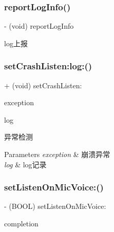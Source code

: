 \subsubsection{\texorpdfstring{report\+Log\+Info()}{reportLogInfo()}}
{\footnotesize\ttfamily -\/ (void) report\+Log\+Info \begin{DoxyParamCaption}{ }\end{DoxyParamCaption}}

log上报 \mbox{\label{interface_c_c_streamer_basic_ac720b0a4b258eebdc14ab97bac4dc42d}} 
\subsubsection{\texorpdfstring{set\+Crash\+Listen\+:log\+:()}{setCrashListen:log:()}}
{\footnotesize\ttfamily + (void) set\+Crash\+Listen\+: \begin{DoxyParamCaption}\item[{(B\+O\+OL)}]{exception }\item[{log:(B\+O\+OL)}]{log }\end{DoxyParamCaption}}

异常检测 
\begin{DoxyParams}{Parameters}
{\em exception} & 崩溃异常 \\
\hline
{\em log} & log记录 \\
\hline
\end{DoxyParams}
\mbox{\label{interface_c_c_streamer_basic_a742507c8281ac96c43a9636371077de8}} 
\subsubsection{\texorpdfstring{set\+Listen\+On\+Mic\+Voice\+:()}{setListenOnMicVoice:()}}
{\footnotesize\ttfamily -\/ (B\+O\+OL) set\+Listen\+On\+Mic\+Voice\+: \begin{DoxyParamCaption}\item[{(C\+C\+Comletion\+Block)}]{completion }\end{DoxyParamCaption}}

